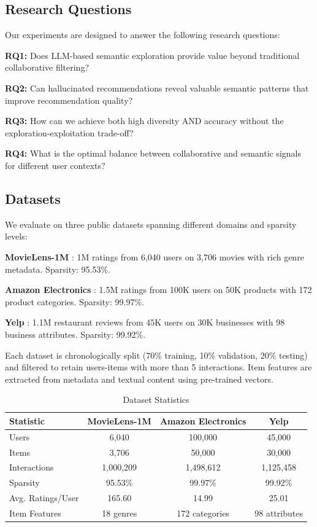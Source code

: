 \documentclass[acmsmall]{acmart}
\begin{document}
\subsection{Research Questions}
Our experiments are designed to answer the following research questions:

\textbf{RQ1:} Does LLM-based semantic exploration provide value beyond traditional collaborative filtering?

\textbf{RQ2:} Can hallucinated recommendations reveal valuable semantic patterns that improve recommendation quality?

\textbf{RQ3:} How can we achieve both high diversity AND accuracy without the exploration-exploitation trade-off?

\textbf{RQ4:} What is the optimal balance between collaborative and semantic signals for different user contexts?

\subsection{Datasets}
We evaluate on three public datasets spanning different domains and sparsity levels:

\textbf{MovieLens-1M} \cite{harper2015movielens}: 1M ratings from 6,040 users on 3,706 movies with rich genre metadata. Sparsity: 95.53\%.

\textbf{Amazon Electronics} \cite{he2016ups}: 1.5M ratings from 100K users on 50K products with 172 product categories. Sparsity: 99.97\%.

\textbf{Yelp} \cite{yelp2025}: 1.1M restaurant reviews from 45K users on 30K businesses with 98 business attributes. Sparsity: 99.92\%.

Each dataset is chronologically split (70\% training, 10\% validation, 20\% testing) and filtered to retain users-items with more than 5 interactions. Item features are extracted from metadata and textual content using pre-trained vectors.

\begin{table}[h]
\centering
\caption{Dataset Statistics}
\label{tab:dataset-statistics}
\small
\begin{tabular}{lccc}
\toprule
\textbf{Statistic} & \textbf{MovieLens-1M} & \textbf{Amazon Electronics} & \textbf{Yelp} \\
\midrule
Users & 6,040 & 100,000 & 45,000 \\
Items & 3,706 & 50,000 & 30,000 \\
Interactions & 1,000,209 & 1,498,612 & 1,125,458 \\
Sparsity & 95.53\% & 99.97\% & 99.92\% \\
Avg. Ratings/User & 165.60 & 14.99 & 25.01 \\
Item Features & 18 genres & 172 categories & 98 attributes \\
\bottomrule
\end{tabular}
\end{table}
\end{document}
